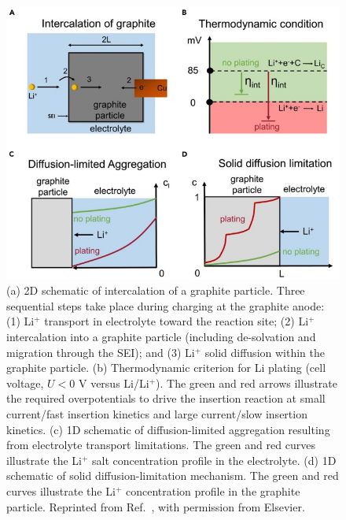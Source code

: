 \documentclass[../main.tex]{subfiles}
\begin{document}
\begin{figure}
    \centering
    \includegraphics[scale=0.75]{figures/li_plating.jpg}
    \caption{(a) 2D schematic of intercalation of a graphite particle. Three sequential steps take place during charging at the graphite anode: (1) Li$^+$ transport in electrolyte toward the reaction site; (2) Li$^+$ intercalation into a graphite particle (including de-solvation and migration through the SEI); and (3) Li$^+$ solid diffusion within the graphite particle. (b) Thermodynamic criterion for Li plating (cell voltage, $U < 0$ V versus Li/Li$^+$). The green and red arrows illustrate the required overpotentials to drive the insertion reaction at small current/fast insertion kinetics and large current/slow insertion kinetics. (c) 1D schematic of diffusion-limited aggregation resulting from electrolyte transport limitations. The green and red curves illustrate the Li$^+$ salt concentration profile in the electrolyte. (d) 1D schematic of solid diffusion-limitation mechanism. The green and red curves illustrate the Li$^+$ concentration profile in the graphite particle. Reprinted from Ref.~, with permission from Elsevier.}
    \label{fig:li_plating}
\end{figure}
\end{document}
